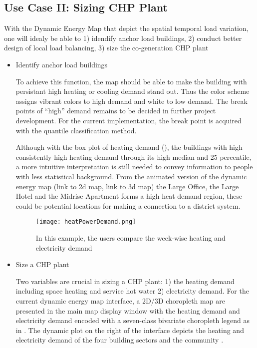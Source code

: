 \subsection{Use Case II: Sizing CHP Plant}
With the Dynamic Energy Map that depict the spatial temporal load
variation, one will idealy be able to 1) idendify anchor load
buildings, 2) conduct better design of local load balancing, 3) size
the co-generation CHP plant

\begin{itemize}
\item Identify anchor load buildings
  
  To achieve this function, the map should be able to make the
  building with persistant high heating or cooling demand stand
  out. Thus the color scheme assigns vibrant colors to high demand and
  white to low demand. The break points of ``high'' demand remains to
  be decided in further project development. For the current
  implementation, the break point is acquired with the quantile
  classification method.

  Although with the box plot of heating demand (), the
  buildings with high consistently high heating demand through its
  high median and 25 percentile, a more intuitive interpretation is
  still needed to convey information to people with less statistical
  background. From the animated version of the dynamic energy map
  (link to 2d map, link to 3d map) the Large Office, the Large Hotel
  and the Midrise Apartment forms a high heat demand region, these
  could be potential locations for making a connection to a district
  system.

  \begin{figure}[h!]
    \centering
    \texttt{[image: heatPowerDemand.png]}
    \caption[Comparing Community Heating and Electricity Demand]{In
      this example, the users compare the week-wise heating and
      electricity demand}
    \label{fig:heatPowerDemand}
  \end{figure}
\item Size a CHP plant 

  Two variables are crucial in sizing a CHP plant: 1) the heating
  demand including space heating and service hot water 2) electricity
  demand. For the current dynamic energy map interface, a 2D/3D
  choropleth map are presented in the main map display window with the
  heating demand and electricity demand encoded with a seven-class
  bivariate choropleth legend as in . The dynamic
  plot on the right of the interface depicts the heating and
  electricity demand of the four building sectors and the community .


\end{itemize}
